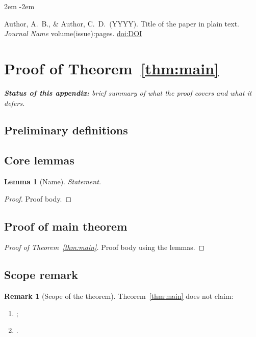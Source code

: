 \documentclass[11pt,a4paper]{article}
\theoremstyle{plain}
\newtheorem{lemma}[theorem]{Lemma}
\theoremstyle{definition}
\newtheorem{remark}[theorem]{Remark}
\begin{document}
\begin{list}{}{\leftmargin 2em \itemindent -2em \itemsep 4pt}

\item Author, A.\ B., \& Author, C.\ D.\ (YYYY). Title of the paper
in plain text. \emph{Journal Name} volume(issue):pages.
\href{https://doi.org/DOI}{doi:DOI}

\end{list}


\appendix

\section{Proof of Theorem~\ref{thm:main}}
\label{app:proof}

\textit{\textbf{Status of this appendix:} brief summary of what the
proof covers and what it defers.}

\subsection{Preliminary definitions}

\subsection{Core lemmas}

\begin{lemma}[Name]
\label{lem:support}
Statement.
\end{lemma}

\begin{proof}
Proof body.
\end{proof}

\subsection{Proof of main theorem}

\begin{proof}[Proof of Theorem~\ref{thm:main}]
Proof body using the lemmas.
\end{proof}

\subsection{Scope remark}

\begin{remark}[Scope of the theorem]
Theorem~\ref{thm:main} does not claim:
\begin{enumerate}
\item [specific limitation 1];
\item [specific limitation 2].
\end{enumerate}
\end{remark}
\end{document}
